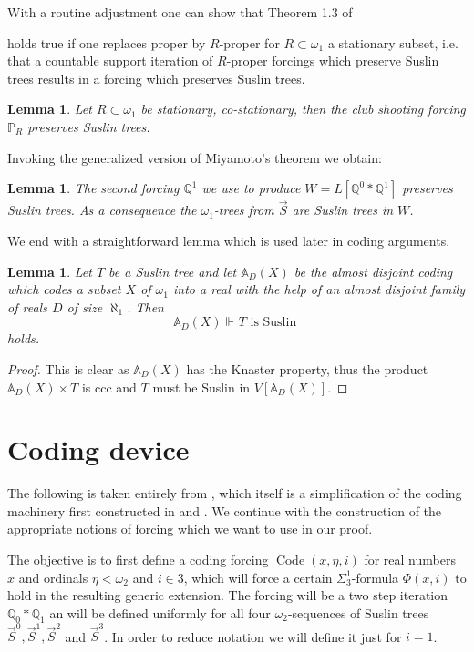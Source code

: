 \documentclass[a4paper,11pt]{article}
\newtheorem{lemma}[theorem]{Lemma}
\newcommand{\forceP}{\mathbb{P}}
\newcommand{\forceQ}{\mathbb{Q}}
\begin{document}
{With a routine adjustment one can show that Theorem 1.3 of} \cite{Miyamoto2}{ holds true if one replaces proper by $R$-proper for $R \subset \omega_1$ a stationary subset, i.e. that a countable support iteration of $R$-proper forcings which preserve Suslin trees results in a forcing which preserves Suslin trees.
\begin{lemma}\label{omegadistributive}
Let $R \subset \omega_1$ be stationary, co-stationary, then the club shooting forcing $\forceP_R$ preserves Suslin trees.
\end{lemma}

Invoking the generalized version of Miyamoto's theorem we obtain:
\begin{lemma}
The second forcing $\forceQ^1$ we use to produce $W=L[\forceQ^0 \ast \forceQ^1]$ preserves Suslin trees. As a consequence the $\omega_1$-trees from $\vec{S}$ are Suslin trees in $W$.
\end{lemma}



We end with a straightforward lemma which is used later in coding arguments.

\begin{lemma}\label{a.d.coding preserves Suslin trees}
 Let $T$ be a Suslin tree and let $\mathbb{A}_D(X)$ be the almost disjoint coding which codes
 a subset $X$ of $\omega_1$ into a real with the help of an almost disjoint family
 of reals $D$ of size $\aleph_1$. Then $$\mathbb{A}_{D}(X) \Vdash_{} T \text{ is Suslin }$$
 holds.
\end{lemma}
\begin{proof}
 This is clear as $\mathbb{A}_{D}(X)$ has the Knaster property, thus the product $\mathbb{A}_{D}(X) \times T$ is ccc and $T$ must be Suslin in $V[{\mathbb{A}_{D}(X)}]$. 
\end{proof}


\section{Coding device}
The following is taken entirely from \cite{Ho7}, which itself is a simplification of the coding machinery first constructed in \cite{Ho2} and \cite{Ho4}. We continue with the construction of the appropriate notions of forcing which we want to use in our proof.

The objective is to first define a coding forcing \(\operatorname{Code}(x,\eta, i)\) for real numbers \( x \) and ordinals $\eta < \omega_2$ and $i \in 3$, which will force a certain \(\Sigma^1_3\)-formula \(\Phi(x,i)\) to hold in the resulting generic extension. The forcing will be a two step iteration $\forceQ_0 \ast \forceQ_1$ an will be defined uniformly for all four $\omega_2$-sequences of Suslin trees $\vec{S}^0,\vec{S}^1,\vec{S}^2$ and $\vec{S}^3$. In order to reduce notation we will define it just for $i=1$.


}
\end{document}
